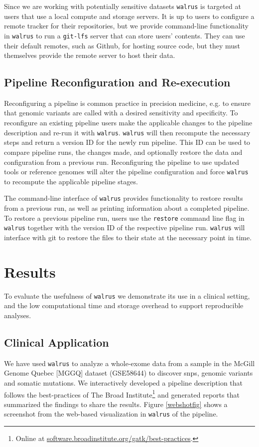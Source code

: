 Since we are working with potentially sensitive datasets \texttt{walrus} is
targeted at users that use a local compute and storage servers. It is up to
users to configure a remote tracker for their repositories, but we provide
command-line functionality in \texttt{walrus} to run a \texttt{git-lfs} server
that can store users' contents.  They can use their default remotes, such as
Github, for hosting source code, but they must themselves provide the remote
server to host their data.

\subsection{Pipeline Reconfiguration and Re-execution}
Reconfiguring a pipeline is common practice in precision medicine, e.g. to
ensure that genomic variants are called with a desired sensitivity and
specificity.  To reconfigure an existing pipeline users make the applicable
changes to the pipeline description and re-run it with \texttt{walrus}.
\texttt{walrus} will then recompute the necessary steps and return a version ID
for the newly run pipeline. This ID can be used to compare pipeline runs, the
changes made, and optionally restore the data and configuration from a
previous run.  Reconfiguring the pipeline to use updated tools or reference
genomes will alter the pipeline configuration and force \texttt{walrus} to
recompute the applicable pipeline stages. 

The command-line interface of \texttt{walrus} provides functionality to restore
results from a previous run, as well as printing information about a completed
pipeline.  To restore a previous pipeline run, users use the \texttt{restore}
command line flag in \texttt{walrus} together with the version ID of the
respective pipeline run. \texttt{walrus} will interface with git to restore the
files to their state at the necessary point in time.

\section{Results}
To evaluate the usefulness of \texttt{walrus} we demonstrate its use in a
clinical setting, and the low computational time and storage overhead to support
reproducible analyses.

\subsection{Clinical Application} 
We have used \texttt{walrus} to analyze a whole-exome data from a sample
in the McGill Genome Quebec [MGGQ] dataset (GSE58644)\cite{tofigh2014prognostic}
to discover \glspl{snp}, genomic variants and somatic mutations. We
interactively developed a pipeline description that follows the best-practices
of The Broad Institute\footnote{Online at
\url{software.broadinstitute.org/gatk/best-practices}.} and generated reports
that summarized the findings to share the results. Figure \ref{webshotfig} shows
a screenshot from the web-based visualization in \texttt{walrus} of the
pipeline. 

